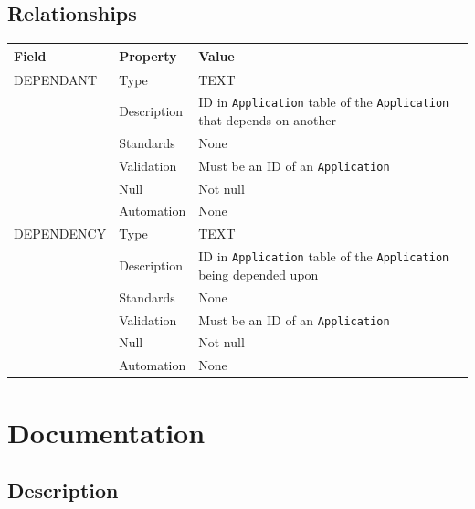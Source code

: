 \documentclass[
]{article}
\newcounter{none} %
\begin{document}
\subsection{Relationships}\label{relationships-8}

{\def\LTcaptype{none} %
\begin{longtable}[]{@{}
  >{\raggedright\arraybackslash}p{}
  >{\raggedright\arraybackslash}p{}
  >{\raggedright\arraybackslash}p{}@{}}
\toprule\noalign{}
\begin{minipage}[b]{\linewidth}\raggedright
Field
\end{minipage} & \begin{minipage}[b]{\linewidth}\raggedright
Property
\end{minipage} & \begin{minipage}[b]{\linewidth}\raggedright
Value
\end{minipage} \\
\midrule\noalign{}
\endhead
\bottomrule\noalign{}
\endlastfoot
DEPENDANT & Type & TEXT \\
& Description & ID in \texttt{Application} table of the
\texttt{Application} that depends on another \\
& Standards & None \\
& Validation & Must be an ID of an \texttt{Application} \\
& Null & Not null \\
& Automation & None \\
DEPENDENCY & Type & TEXT \\
& Description & ID in \texttt{Application} table of the
\texttt{Application} being depended upon \\
& Standards & None \\
& Validation & Must be an ID of an \texttt{Application} \\
& Null & Not null \\
& Automation & None \\
\end{longtable}
}

\section{Documentation}\label{documentation}

\subsection{Description}\label{description-11}
\end{document}
